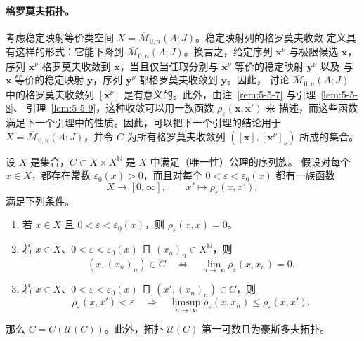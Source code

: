 \paragraph{格罗莫夫拓扑。}
考虑稳定映射等价类空间 $X=\overline{\mathcal M}_{0,n}(A;J)$。稳定映射列的格罗莫夫收敛
定义具有这样的形式：它能下降到 $\overline{\mathcal M}_{0,n}(A;J)$。换言之，给定序列
$\mathbf x^\nu$ 与极限候选 $\mathbf x$，序列 $\mathbf x^\nu$ 格罗莫夫收敛到
$\mathbf x$，当且仅当任取分别与 $\mathbf x^\nu$ 等价的稳定映射 $\mathbf y^\nu$ 以及
与 $\mathbf x$ 等价的稳定映射 $\mathbf y$，序列 $\mathbf y^\nu$ 都格罗莫夫收敛到
$\mathbf y$。因此，
讨论 $\overline{\mathcal M}_{0,n}(A;J)$ 中的格罗莫夫收敛列
$[\mathbf x^\nu]$ 是有意义的。此外，由注~\ref{rem:5-5-7} 与引理~\ref{lem:5-5-8}、
引理~\ref{lem:5-5-9}，这种收敛可以用一族函数 $\rho_\varepsilon(\mathbf x,\mathbf x')$ 来
描述，而这些函数满足下一个引理中的性质。因此，可以把下一个引理的结论用于
$X=\overline{\mathcal M}_{0,n}(A;J)$，并令 $C$ 为所有格罗莫夫收敛列
$([\mathbf x],[\mathbf x^\nu]_\nu)$ 所成的集合。

\begin{lemma}\label{lem:5-6-5}
设 $X$ 是集合，$C\subset X\times X^{\mathbb N}$ 是 $X$ 中满足（唯一性）公理的序列族。
假设对每个 $x\in X$，都存在常数 $\varepsilon_0(x)>0$，而且对每个
$0<\varepsilon<\varepsilon_0(x)$ 都有一族函数
\[
  X\longrightarrow[0,\infty],
  \qquad x'\longmapsto\rho_\varepsilon(x,x'),
\]
满足下列条件。
\begin{enumerate}[label=(\alph*),leftmargin=3em]
\item 若 $x\in X$ 且 $0<\varepsilon<\varepsilon_0(x)$，则
  $\rho_\varepsilon(x,x)=0$。
\item 若 $x\in X$、$0<\varepsilon<\varepsilon_0(x)$ 且
  $(x_n)_n\in X^{\mathbb N}$，则
  \[
    (x,(x_n)_n)\in C
    \quad\Longleftrightarrow\quad
    \lim_{n\to\infty}\rho_\varepsilon(x,x_n)=0.
  \]
\item 若 $x\in X$、$0<\varepsilon<\varepsilon_0(x)$ 且
  $(x',(x_n)_n)\in C$，则
  \[
    \rho_\varepsilon(x,x')<\varepsilon
    \quad\Longrightarrow\quad
    \limsup_{n\to\infty}\rho_\varepsilon(x,x_n)
    \le\rho_\varepsilon(x,x').
  \]
\end{enumerate}
那么 $C=C(\mathcal U(C))$。此外，拓扑 $\mathcal U(C)$ 第一可数且为豪斯多夫拓扑。
\end{lemma}

